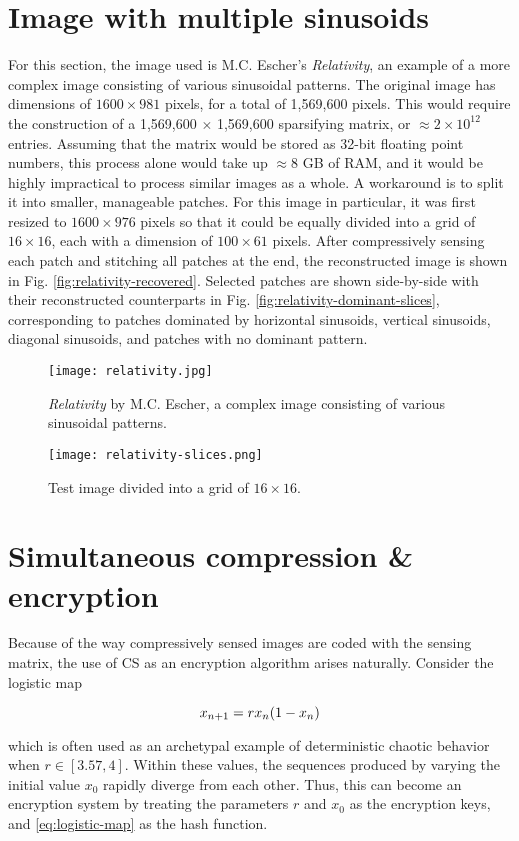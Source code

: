 \section{Image with multiple sinusoids}
\label{sec:2dmultisin}
For this section, the image used is M.C. Escher's \textit{Relativity}, an example of a more complex image consisting of various sinusoidal patterns. The original image has dimensions of $1600 \times 981$ pixels, for a total of 1,569,600 pixels. This would require the construction of a 1,569,600 $\times$ 1,569,600 sparsifying matrix, or $\approx 2 \times 10^{12}$ entries. Assuming that the matrix would be stored as 32-bit floating point numbers, this process alone would take up $\approx 8$ GB of RAM, and it would be highly impractical to process similar images as a whole. A workaround is to split it into smaller, manageable patches. For this image in particular, it was first resized to $1600 \times 976$ pixels so that it could be equally divided into a grid of $16 \times 16$, each with a dimension of $100 \times 61$ pixels. After compressively sensing each patch and stitching all patches at the end, the reconstructed image is shown in Fig. \ref{fig:relativity-recovered}. Selected patches are shown side-by-side with their reconstructed counterparts in Fig. \ref{fig:relativity-dominant-slices}, corresponding to patches dominated by horizontal sinusoids, vertical sinusoids, diagonal sinusoids, and patches with no dominant pattern.


\begin{figure}[tb]
	\texttt{[image: relativity.jpg]}
	\caption{\textit{Relativity} by M.C. Escher, a complex image consisting of various sinusoidal patterns.}
	\label{fig:relativity}
\end{figure}

\begin{figure}[tb]
	\texttt{[image: relativity-slices.png]}
	\caption{Test image divided into a grid of $16 \times 16$.}
	\label{fig:relativity-slices}
\end{figure}


\section{Simultaneous compression \& encryption}
Because of the way compressively sensed images are coded with the sensing matrix, the use of CS as an encryption algorithm arises naturally. Consider the logistic map

\begin{equation}\label{eq:logistic-map}
	x_{n+1} = r x_n \qty(1 - x_n)
\end{equation}

\noindent which is often used as an archetypal example of deterministic chaotic behavior when $r \in [3.57, 4]$. Within these values, the sequences produced by varying the initial value $x_0$ rapidly diverge from each other. Thus, this can become an encryption system by treating the parameters $r$ and $x_0$ as the encryption keys, and \eqref{eq:logistic-map} as the hash function. 
